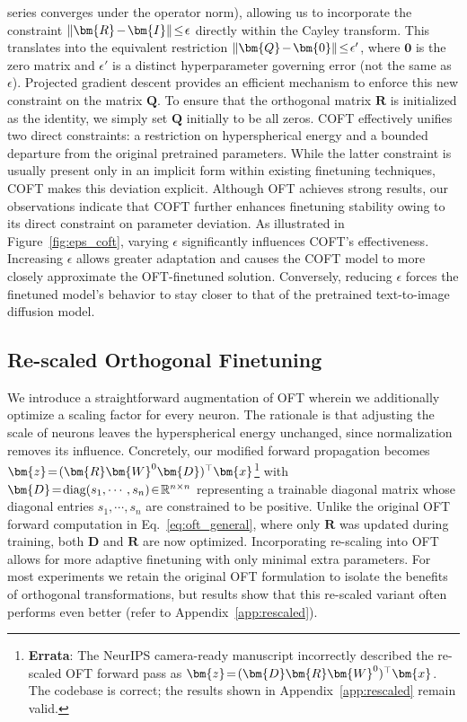 series converges under the operator norm), allowing us to incorporate the constraint $\thickmuskip=2mu \medmuskip=2mu\|\bm{R}-\bm{I}\|\leq\epsilon$ directly within the Cayley transform. This translates into the equivalent restriction $\thickmuskip=2mu \medmuskip=2mu \|\bm{Q}-\bm{0}\|\leq\epsilon'$, where $\bm{0}$ is the zero matrix and $\epsilon'$ is a distinct hyperparameter governing error (not the same as $\epsilon$). Projected gradient descent provides an efficient mechanism to enforce this new constraint on the matrix $\bm{Q}$. To ensure that the orthogonal matrix $\bm{R}$ is initialized as the identity, we simply set $\bm{Q}$ initially to be all zeros. COFT effectively unifies two direct constraints: a restriction on hyperspherical energy and a bounded departure from the original pretrained parameters. While the latter constraint is usually present only in an implicit form within existing finetuning techniques, COFT makes this deviation explicit. Although OFT achieves strong results, our observations indicate that COFT further enhances finetuning stability owing to its direct constraint on parameter deviation. As illustrated in Figure~\ref{fig:eps_coft}, varying $\epsilon$ significantly influences COFT's effectiveness. Increasing $\epsilon$ allows greater adaptation and causes the COFT model to more closely approximate the OFT-finetuned solution. Conversely, reducing $\epsilon$ forces the finetuned model’s behavior to stay closer to that of the pretrained text-to-image diffusion model.

\subsection{Re-scaled Orthogonal Finetuning}

We introduce a straightforward augmentation of OFT wherein we additionally optimize a scaling factor for every neuron. The rationale is that adjusting the scale of neurons leaves the hyperspherical energy unchanged, since normalization removes its influence. Concretely, our modified forward propagation becomes $\thickmuskip=2mu \medmuskip=2mu\bm{z}=(\bm{R}\bm{W}^0\bm{D})^\top\bm{x}$\footnote{\textbf{Errata}: The NeurIPS camera-ready manuscript incorrectly described the re-scaled OFT forward pass as $\thickmuskip=2mu \medmuskip=2mu\bm{z}=(\bm{D}\bm{R}\bm{W}^0)^\top\bm{x}$. The codebase is correct; the results shown in Appendix~\ref{app:rescaled} remain valid.} with $\thickmuskip=2mu \medmuskip=2mu \bm{D}=\text{diag}(s_1,\cdots,s_n)\in\mathbb{R}^{n\times n}$ representing a trainable diagonal matrix whose diagonal entries $s_1,\cdots,s_n$ are constrained to be positive. Unlike the original OFT forward computation in Eq.~\eqref{eq:oft_general}, where only $\bm{R}$ was updated during training, both $\bm{D}$ and $\bm{R}$ are now optimized. Incorporating re-scaling into OFT allows for more adaptive finetuning with only minimal extra parameters. For most experiments we retain the original OFT formulation to isolate the benefits of orthogonal transformations, but results show that this re-scaled variant often performs even better (refer to Appendix~\ref{app:rescaled}).

